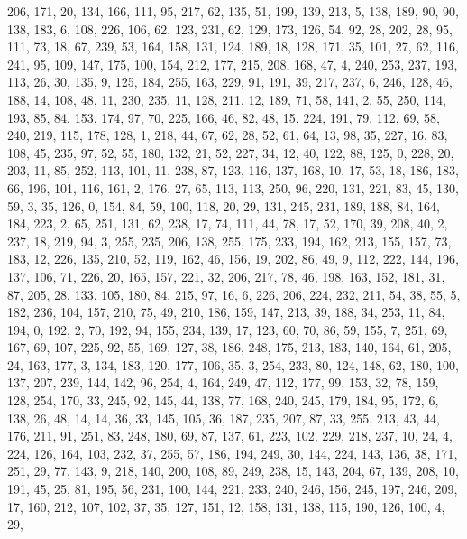 \begin{DoxyCode}
       206, 171, 20, 134, 166, 111, 95, 217, 62, 135, 51, 199, 139, 213, 5, 138, 189, 90, 90, 138, 183, 6, 108, 226,
       106, 62, 123, 231, 62, 129, 173, 126, 54, 92, 28, 202, 28, 95, 111, 73, 18, 67, 239, 53, 164, 158, 131, 124,
       189, 18, 128, 171, 35, 101, 27, 62, 116, 241, 95, 109, 147, 175, 100, 154, 212, 177, 215, 208, 168, 47, 4,
       240, 253, 237, 193, 113, 26, 30, 135, 9, 125, 184, 255, 163, 229, 91, 191, 39, 217, 237, 6, 246, 128, 46,
       188, 14, 108, 48, 11, 230, 235, 11, 128, 211, 12, 189, 71, 58, 141, 2, 55, 250, 114, 193, 85, 84, 153, 174, 97,
       70, 225, 166, 46, 82, 48, 15, 224, 191, 79, 112, 69, 58, 240, 219, 115, 178, 128, 1, 218, 44, 67, 62, 28,
       52, 61, 64, 13, 98, 35, 227, 16, 83, 108, 45, 235, 97, 52, 55, 180, 132, 21, 52, 227, 34, 12, 40, 122, 88,
       125, 0, 228, 20, 203, 11, 85, 252, 113, 101, 11, 238, 87, 123, 116, 137, 168, 10, 17, 53, 18, 186, 183, 66,
       196, 101, 116, 161, 2, 176, 27, 65, 113, 113, 250, 96, 220, 131, 221, 83, 45, 130, 59, 3, 35, 126, 0, 154, 84,
       59, 100, 118, 20, 29, 131, 245, 231, 189, 188, 84, 164, 184, 223, 2, 65, 251, 131, 62, 238, 17, 74, 111,
       44, 78, 17, 52, 170, 39, 208, 40, 2, 237, 18, 219, 94, 3, 255, 235, 206, 138, 255, 175, 233, 194, 162, 213,
       155, 157, 73, 183, 12, 226, 135, 210, 52, 119, 162, 46, 156, 19, 202, 86, 49, 9, 112, 222, 144, 196, 137, 106,
       71, 226, 20, 165, 157, 221, 32, 206, 217, 78, 46, 198, 163, 152, 181, 31, 87, 205, 28, 133, 105, 180, 84,
       215, 97, 16, 6, 226, 206, 224, 232, 211, 54, 38, 55, 5, 182, 236, 104, 157, 210, 75, 49, 210, 186, 159, 147,
       213, 39, 188, 34, 253, 11, 84, 194, 0, 192, 2, 70, 192, 94, 155, 234, 139, 17, 123, 60, 70, 86, 59, 155, 7,
       251, 69, 167, 69, 107, 225, 92, 55, 169, 127, 38, 186, 248, 175, 213, 183, 140, 164, 61, 205, 24, 163, 177,
       3, 134, 183, 120, 177, 106, 35, 3, 254, 233, 80, 124, 148, 62, 180, 100, 137, 207, 239, 144, 142, 96, 254,
       4, 164, 249, 47, 112, 177, 99, 153, 32, 78, 159, 128, 254, 170, 33, 245, 92, 145, 44, 138, 77, 168, 240, 245,
       179, 184, 95, 172, 6, 138, 26, 48, 14, 14, 36, 33, 145, 105, 36, 187, 235, 207, 87, 33, 255, 213, 43, 44,
       176, 211, 91, 251, 83, 248, 180, 69, 87, 137, 61, 223, 102, 229, 218, 237, 10, 24, 4, 224, 126, 164, 103,
       232, 37, 255, 57, 186, 194, 249, 30, 144, 224, 143, 136, 38, 171, 251, 29, 77, 143, 9, 218, 140, 200, 108, 89,
       249, 238, 15, 143, 204, 67, 139, 208, 10, 191, 45, 25, 81, 195, 56, 231, 100, 144, 221, 233, 240, 246, 156,
       245, 197, 246, 209, 17, 160, 212, 107, 102, 37, 35, 127, 151, 12, 158, 131, 138, 115, 190, 126, 100, 4, 29,

\end{DoxyCode}
